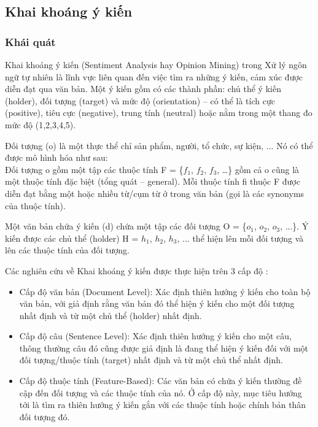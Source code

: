 \documentclass[12pt]{extarticle}
\begin{document}
		\subsection{Khai khoáng ý kiến}
			\subsubsection*{Khái quát}
				\par Khai khoáng ý kiến (Sentiment Analysis hay Opinion Mining) trong Xử lý ngôn ngữ tự nhiên là lĩnh vực liên quan đến việc tìm ra những ý kiến, cảm xúc được diễn đạt qua văn bản. Một ý kiến gồm có các thành phần: chủ thể ý kiến (holder), đối tượng (target) và mức độ (orientation) – có thể là tích cực (positive), tiêu cực (negative), trung tính (neutral) hoặc nằm trong một thang đo mức độ (1,2,3,4,5).
				\par Đối tượng (o) là một thực thể chỉ sản phẩm, người, tổ chức, sự kiện, ... Nó có thể được mô hình hóa như sau:\\				
				Đối tượng o gồm một tập các thuộc tính F = \{$f_1$, $f_2$, $f_3$, …\} gồm cả o cũng là một thuộc tính đặc biệt (tổng quát – general). Mỗi thuộc tính fi thuộc F được diễn đạt bằng một hoặc nhiều từ/cụm từ ở trong văn bản (gọi là các synonyms của thuộc tính).
				\par Một văn bản chứa ý kiến (d) chứa một tập các đối tượng O = \{$o_1$, $o_2$, $o_3$, ...\}. Ý kiến được các chủ thể (holder) H = {$h_1$, $h_2$, $h_3$, ...} thể hiện lên mỗi đối tượng và lên các thuộc tính của đối tượng. 
				\par Các nghiên cứu về Khai khoáng ý kiến được thực hiện trên 3 cấp độ \cite{sentiment}:
				\begin{itemize}
					\item{Cấp độ văn bản (Document Level): Xác định thiên hướng ý kiến cho toàn bộ văn bản, với giả định rằng văn bản đó thể hiện ý kiến cho một đối tượng nhất định và từ một chủ thể (holder) nhất định.}		
					\item{Cấp độ câu (Sentence Level): Xác định thiên hướng ý kiến cho một câu, thông thường câu đó cũng được giả định là đang thể hiện ý kiến đối với một đối tượng/thuộc tính (target) nhất định và từ một chủ thể nhất định.}
					\item{Cấp độ thuộc tính (Feature-Based): Các văn bản có chứa ý kiến thường đề cập đến đối tượng và các thuộc tính của nó. Ở cấp độ này, mục tiêu hướng tới là tìm ra thiên hướng ý kiến gắn với các thuộc tính hoặc chính bản thân đối tượng đó.}
				\end{itemize}				
\end{document}

